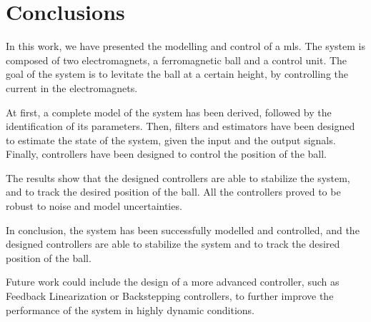 \section{Conclusions}
\label{sec:conclusions}

In this work, we have presented the modelling and control of a \acrfull{mls}.
The system is composed of two electromagnets, a ferromagnetic ball and a control unit.
The goal of the system is to levitate the ball at a certain height, by controlling the current in the electromagnets.

At first, a complete model of the system has been derived, followed by the identification of its parameters.
Then, filters and estimators have been designed to estimate the state of the system, given the input and the output signals.
Finally, controllers have been designed to control the position of the ball.

The results show that the designed controllers are able to stabilize the system, and to track the desired position of the ball.
All the controllers proved to be robust to noise and model uncertainties.

In conclusion, the system has been successfully modelled and controlled, and the designed controllers are able to stabilize the system and to track the desired position of the ball.

Future work could include the design of a more advanced controller, such as Feedback Linearization or Backstepping controllers, to further improve the performance of the system in highly dynamic conditions.